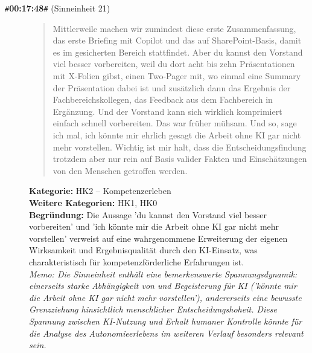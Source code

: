 \begin{description}
  \item[\texttt{\#}\textbf{00:17:48}\texttt{\#} (Sinneinheit 21)]
  \begin{quote}
  Mittlerweile machen wir zumindest diese erste Zusammenfassung, das erste Briefing mit Copilot und das auf SharePoint-Basis, damit es im gesicherten Bereich stattfindet. Aber du kannst den Vorstand viel besser vorbereiten, weil du dort acht bis zehn Präsentationen mit X-Folien gibst, einen Two-Pager mit, wo einmal eine Summary der Präsentation dabei ist und zusätzlich dann das Ergebnis der Fachbereichskollegen, das Feedback aus dem Fachbereich in Ergänzung. Und der Vorstand kann sich wirklich komprimiert einfach schnell vorbereiten. Das war früher mühsam. Und so, sage ich mal, ich könnte mir ehrlich gesagt die Arbeit ohne KI gar nicht mehr vorstellen. Wichtig ist mir halt, dass die Entscheidungsfindung trotzdem aber nur rein auf Basis valider Fakten und Einschätzungen von den Menschen getroffen werden.
  \end{quote}
  \textbf{Kategorie:} HK2 -- Kompetenzerleben\\
  \textbf{Weitere Kategorien:} HK1, HK0\\
  \textbf{Begr\"undung:} Die Aussage 'du kannst den Vorstand viel besser vorbereiten' und 'ich könnte mir die Arbeit ohne KI gar nicht mehr vorstellen' verweist auf eine wahrgenommene Erweiterung der eigenen Wirksamkeit und Ergebnisqualität durch den KI-Einsatz, was charakteristisch für kompetenzförderliche Erfahrungen ist.
  \\\textit{Memo: Die Sinneinheit enthält eine bemerkenswerte Spannungsdynamik: einerseits starke Abhängigkeit von und Begeisterung für KI ('könnte mir die Arbeit ohne KI gar nicht mehr vorstellen'), andererseits eine bewusste Grenzziehung hinsichtlich menschlicher Entscheidungshoheit. Diese Spannung zwischen KI-Nutzung und Erhalt humaner Kontrolle könnte für die Analyse des Autonomieerlebens im weiteren Verlauf besonders relevant sein.}
\end{description}
\medskip

